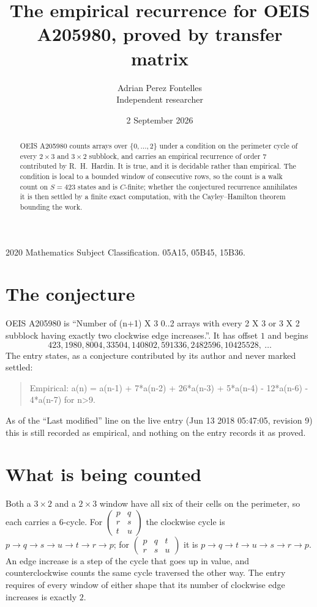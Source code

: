 \documentclass[11pt,a4paper]{article}
\title{The empirical recurrence for OEIS A205980, proved by transfer matrix}
\author{Adrian Perez Fontelles\\ \small Independent researcher}
\date{2 September 2026}
\theoremstyle{plain}
\theoremstyle{definition}
\begin{document}
\maketitle

\begin{abstract}
OEIS A205980 counts arrays over $\{0,\dots,2\}$ under a condition on the perimeter cycle of
every $2\times3$ and $3\times2$ subblock, and carries an empirical recurrence of order $7$ contributed by
R.~H.~Hardin. It is true, and it is decidable rather than empirical. The condition is local to
a bounded window of consecutive rows, so the count is a walk count on $S=423$ states and is
$C$-finite; whether the conjectured recurrence annihilates it is then settled by a finite exact
computation, with the Cayley--Hamilton theorem bounding the work.
\end{abstract}

\noindent\small 2020 Mathematics Subject Classification. 05A15, 05B45, 15B36.\normalsize

\section{The conjecture}

OEIS A205980 is ``Number of (n+1) X 3 0..2 arrays with every 2 X 3 or 3 X 2 subblock having exactly two clockwise edge increases.''. It has offset $1$ and begins
\[
423, 1980, 8004, 33504, 140802, 591336, 2482596, 10425528,\ \dots
\]
The entry states, as a conjecture contributed by its author and never marked settled:
\begin{quote}
Empirical: a(n) = a(n-1) + 7*a(n-2) + 26*a(n-3) + 5*a(n-4) - 12*a(n-6) - 4*a(n-7) for n>9.
\end{quote}
As of the ``Last modified'' line on the live entry (Jun 13 2018 05:47:05, revision 9) this is still
recorded as empirical, and nothing on the entry records it as proved.

\section{What is being counted}

Both a $3\times2$ and a $2\times3$ window have all six of their cells on the
perimeter, so each carries a $6$-cycle. For
$\begin{pmatrix}p&q\\r&s\\t&u\end{pmatrix}$ the clockwise cycle is
$p\to q\to s\to u\to t\to r\to p$; for
$\begin{pmatrix}p&q&t\\r&s&u\end{pmatrix}$ it is
$p\to q\to t\to u\to s\to r\to p$. An edge increase is a step of the cycle that goes up in
value, and counterclockwise counts the same cycle traversed the other way. The entry requires
of every window of either shape that its number of clockwise edge increases is exactly $2$.
\end{document}
